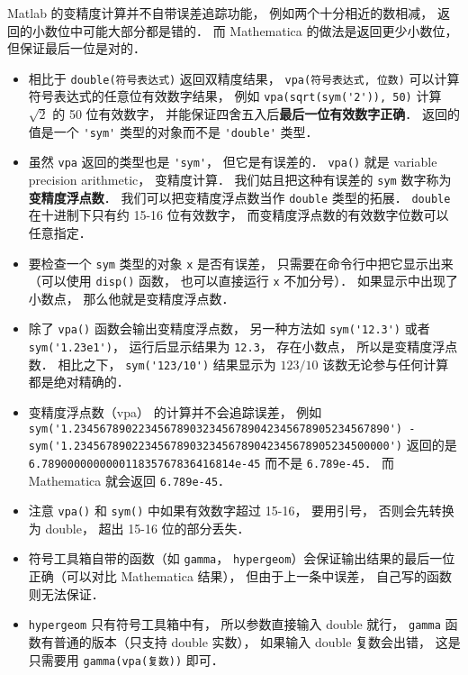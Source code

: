 Matlab 的变精度计算并不自带误差追踪功能， 例如两个十分相近的数相减， 返回的小数位中可能大部分都是错的． 而 Mathematica 的做法是返回更少小数位， 但保证最后一位是对的．

\begin{itemize}
\item 相比于 \verb|double(符号表达式)| 返回双精度结果， \verb|vpa(符号表达式, 位数)| 可以计算符号表达式的任意位有效数字结果， 例如 \verb|vpa(sqrt(sym('2')), 50)| 计算 $\sqrt{2}$ 的 50 位有效数字， 并能保证四舍五入后\textbf{最后一位有效数字正确}． 返回的值是一个 \verb|'sym'| 类型的对象而不是 \verb|'double'| 类型．

\item 虽然 \verb|vpa| 返回的类型也是 \verb|'sym'|， 但它是有误差的． \verb|vpa()| 就是 variable precision arithmetic， 变精度计算． 我们姑且把这种有误差的 \verb|sym| 数字称为\textbf{变精度浮点数}． 我们可以把变精度浮点数当作 \verb|double| 类型的拓展． \verb|double| 在十进制下只有约 15-16 位有效数字， 而变精度浮点数的有效数字位数可以任意指定．

\item 要检查一个 \verb|sym| 类型的对象 \verb|x| 是否有误差， 只需要在命令行中把它显示出来（可以使用 \verb|disp()| 函数， 也可以直接运行 \verb|x| 不加分号）． 如果显示中出现了小数点， 那么他就是变精度浮点数．

\item 除了 \verb|vpa()| 函数会输出变精度浮点数， 另一种方法如 \verb|sym('12.3')| 或者 \verb|sym('1.23e1')|， 运行后显示结果为 \verb|12.3|， 存在小数点， 所以是变精度浮点数． 相比之下， \verb|sym('123/10')| 结果显示为 $123/10$ 该数无论参与任何计算都是绝对精确的．

\item 变精度浮点数（vpa） 的计算并不会追踪误差， 例如 \verb|sym('1.2345678902234567890323456789042345678905234567890') - sym('1.2345678902234567890323456789042345678905234500000')| 返回的是 \verb|6.789000000000011835767836416814e-45| 而不是 \verb|6.789e-45|． 而 Mathematica 就会返回 \verb|6.789e-45|．

\item 注意 \verb|vpa()| 和 \verb|sym()| 中如果有效数字超过 15-16， 要用引号， 否则会先转换为 double， 超出 15-16 位的部分丢失．

\item 符号工具箱自带的函数（如 \verb|gamma|， \verb|hypergeom|）会保证输出结果的最后一位正确（可以对比 Mathematica 结果）， 但由于上一条中误差， 自己写的函数则无法保证．

\item \verb|hypergeom| 只有符号工具箱中有， 所以参数直接输入 double 就行， \verb|gamma| 函数有普通的版本（只支持 double 实数）， 如果输入 double 复数会出错， 这是只需要用 \verb|gamma(vpa(复数))| 即可．


\end{itemize}
